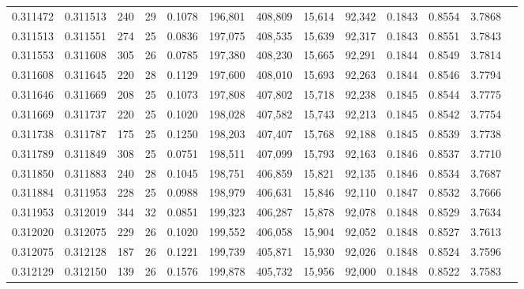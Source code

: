\begin{tabular}{rrrrrrrrrrrrr}
0.311472 & 0.311513 &   240 &  29 &                                     0.1078 & 196,801 & 408,809 &  15,614 &  92,342 & 0.1843 & 0.8554 & 3.7868 \\
0.311513 & 0.311551 &   274 &  25 &                                     0.0836 & 197,075 & 408,535 &  15,639 &  92,317 & 0.1843 & 0.8551 & 3.7843 \\
0.311553 & 0.311608 &   305 &  26 &                                     0.0785 & 197,380 & 408,230 &  15,665 &  92,291 & 0.1844 & 0.8549 & 3.7814 \\
0.311608 & 0.311645 &   220 &  28 &                                     0.1129 & 197,600 & 408,010 &  15,693 &  92,263 & 0.1844 & 0.8546 & 3.7794 \\
0.311646 & 0.311669 &   208 &  25 &                                     0.1073 & 197,808 & 407,802 &  15,718 &  92,238 & 0.1845 & 0.8544 & 3.7775 \\
0.311669 & 0.311737 &   220 &  25 &                                     0.1020 & 198,028 & 407,582 &  15,743 &  92,213 & 0.1845 & 0.8542 & 3.7754 \\
0.311738 & 0.311787 &   175 &  25 &                                     0.1250 & 198,203 & 407,407 &  15,768 &  92,188 & 0.1845 & 0.8539 & 3.7738 \\
0.311789 & 0.311849 &   308 &  25 &                                     0.0751 & 198,511 & 407,099 &  15,793 &  92,163 & 0.1846 & 0.8537 & 3.7710 \\
0.311850 & 0.311883 &   240 &  28 &                                     0.1045 & 198,751 & 406,859 &  15,821 &  92,135 & 0.1846 & 0.8534 & 3.7687 \\
0.311884 & 0.311953 &   228 &  25 &                                     0.0988 & 198,979 & 406,631 &  15,846 &  92,110 & 0.1847 & 0.8532 & 3.7666 \\
0.311953 & 0.312019 &   344 &  32 &                                     0.0851 & 199,323 & 406,287 &  15,878 &  92,078 & 0.1848 & 0.8529 & 3.7634 \\
0.312020 & 0.312075 &   229 &  26 &                                     0.1020 & 199,552 & 406,058 &  15,904 &  92,052 & 0.1848 & 0.8527 & 3.7613 \\
0.312075 & 0.312128 &   187 &  26 &                                     0.1221 & 199,739 & 405,871 &  15,930 &  92,026 & 0.1848 & 0.8524 & 3.7596 \\
0.312129 & 0.312150 &   139 &  26 &                                     0.1576 & 199,878 & 405,732 &  15,956 &  92,000 & 0.1848 & 0.8522 & 3.7583 \\

\end{tabular}
